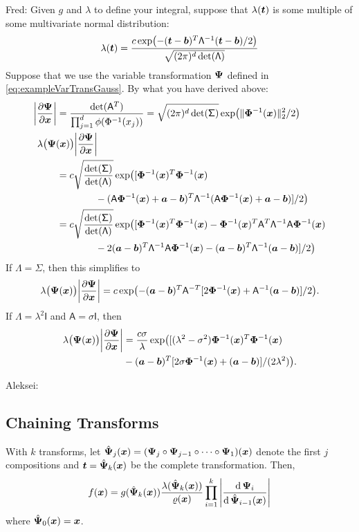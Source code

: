 \documentclass[graybox,footinfo]{svmult}
\newcommand{\QMCPYnormnorm}[2][{}]{\ensuremath{\lVert #2 \rVert}_{#1}}
\newcommand{\QMCPYabs}[1]{\ensuremath{{\left \lvert #1 \right \rvert}}}
\newcommand{\AGSComment}[1]{{\color{cyan} Aleksei: #1}}
\newcommand{\FJHComment}[1]{{\color{magenta} Fred: #1}}
\newcommand{\mA}{\mathsf{A}}
\newcommand{\mSigma}{\mathsf{\Sigma}}
\newcommand{\mLambda}{\mathsf{\Lambda}}
\newcommand{\mI}{\mathsf{I}}
\begin{document}
\FJHComment{Given $g$ and $\lambda$ to define your integral, suppose that $\lambda({\boldsymbol{t}})$ is some multiple of some multivariate normal distribution:
	\begin{equation*}
		\lambda(\bst)  = \frac{c \exp\bigl(-(\bst -\bsb)^T \mLambda^{-1}(\bst -\bsb)/2\bigr)}{\sqrt{ (2\pi)^d \det(\mLambda)}} 
	\end{equation*}
Suppose that we use the variable transformation ${\boldsymbol{\Psi}}$ defined in \eqref{eq:exampleVarTransGauss}.  By what you have derived above:
\begin{align*}
	\QMCPYabs{\frac{\partial \bsPsi}{\partial \bsx}} 
	& = \frac{\det(\mA^T)}{\prod_{j=1}^d \phi(\Phi^{-1}(x_j))} = \sqrt{(2\pi)^d \det(\mSigma)} \exp\bigl( \QMCPYnormnorm[2]{\bsPhi^{-1}(\bsx)}^2/2\bigr) \\
	\MoveEqLeft[2]{\lambda\bigl(\bsPsi(\bsx)\bigr) \QMCPYabs{\frac{\partial \bsPsi}{\partial \bsx}}} \\
	& =  c \sqrt{\frac{\det(\mSigma)}{\det(\mLambda)}} \exp \bigl( [ \bsPhi^{-1}(\bsx)^T \bsPhi^{-1}(\bsx) \\
	& \qquad \qquad -   (\mA\bsPhi^{-1}(\bsx) +\bsa -\bsb)^T\mLambda^{-1}(\mA\bsPhi^{-1}(\bsx) +\bsa -\bsb)        ] /2   \bigr) \\
	& =  c \sqrt{\frac{\det(\mSigma)}{\det(\mLambda)}} \exp \bigl( [ \bsPhi^{-1}(\bsx)^T \bsPhi^{-1}(\bsx) 
	-   \bsPhi^{-1}(\bsx)^T\mA^T\mLambda^{-1}\mA \bsPhi^{-1}(\bsx)\\
	& \qquad \qquad  - 2(\bsa -\bsb)^T \mLambda^{-1}\mA\bsPhi^{-1}(\bsx) - (\bsa -\bsb)^T \mLambda^{-1} (\bsa -\bsb)] /2   \bigr) 
\end{align*}
If $\mLambda = \mSigma$, then this simplifies to
\begin{equation*}
		\lambda\bigl(\bsPsi(\bsx)\bigr) \QMCPYabs{\frac{\partial \bsPsi}{\partial \bsx}}
	 =  c \exp \bigl( - (\bsa -\bsb)^T \mA^{-T} [
	2 \bsPhi^{-1}(\bsx) + \mA^{-1}(\bsa -\bsb)] /2   \bigr) .
\end{equation*}
If $\mLambda = \lambda^2 \mI$ and  $\mA = \sigma \mI$, then 
\begin{align*}
	\lambda\bigl(\bsPsi(\bsx)\bigr) \QMCPYabs{\frac{\partial \bsPsi}{\partial \bsx}}
	& = \frac{c\sigma}{\lambda} 
	\exp \bigl( [ (\lambda^2 -\sigma^2)\bsPhi^{-1}(\bsx)^T\bsPhi^{-1}(\bsx) 
	\\
	& -  (\bsa -\bsb)^T [
	2\sigma \bsPhi^{-1}(\bsx) + (\bsa -\bsb)] /(2\lambda^2)   \bigr) .
\end{align*}
}

\AGSComment{

\subsection{Chaining Transforms}
With $k$ transforms, let $\hat{{\boldsymbol{\Psi}}}_j({\boldsymbol{x}}) = ({\boldsymbol{\Psi}}_j \circ {\boldsymbol{\Psi}}_{j-1} \circ \dots \circ {\boldsymbol{\Psi}}_1)({\boldsymbol{x}})$ denote the first $j$ compositions and ${\boldsymbol{t}} = \hat{{\boldsymbol{\Psi}}}_k({\boldsymbol{x}})$ be the complete transformation. Then, 
$$f({\boldsymbol{x}}) = g(\hat{{\boldsymbol{\Psi}}}_k({\boldsymbol{x}})) \frac{\lambda(\hat{{\boldsymbol{\Psi}}}_k({\boldsymbol{x}}))}{\varrho({\boldsymbol{x}})} \prod_{i=1}^{k} \left\lvert \frac{\mathrm{d} \, {\boldsymbol{\Psi}}_i}{\mathrm{d} \, \hat{{\boldsymbol{\Psi}}}_{i-1}({\boldsymbol{x}})} \right\rvert$$
where $\hat{{\boldsymbol{\Psi}}}_0({\boldsymbol{x}}) = {\boldsymbol{x}}$.
}
\end{document}
